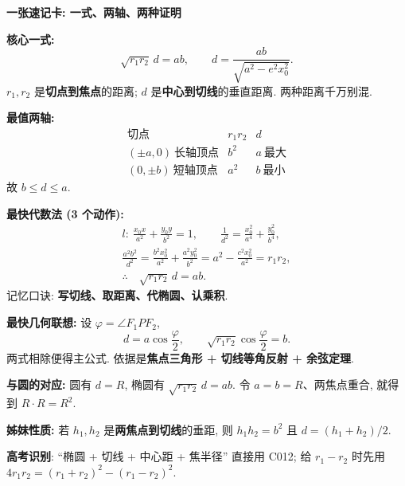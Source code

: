 \begin{summarybox}
\textbf{一张速记卡: 一式、两轴、两种证明}

\textbf{核心一式:}
\[
\boxed{\sqrt{r_1r_2}\,d=ab},\qquad
\boxed{d=\frac{ab}{\sqrt{a^2-e^2x_0^2}}}.
\]
$r_1,r_2$ 是\textbf{切点到焦点}的距离;
$d$ 是\textbf{中心到切线}的垂直距离. 两种距离千万别混.

\textbf{最值两轴:}
\[
\begin{array}{c|c|c}
\text{切点} & r_1r_2 & d\\ \hline
(\pm a,0)\ \text{长轴顶点} & b^2 & \boxed{a}\ \text{最大}\\
(0,\pm b)\ \text{短轴顶点} & a^2 & \boxed{b}\ \text{最小}
\end{array}
\]
故 $b\le d\le a$.

\textbf{最快代数法 (3 个动作):}
\[
\begin{gathered}
l:\ \frac{x_0x}{a^2}+\frac{y_0y}{b^2}=1,\qquad
\frac1{d^2}=\frac{x_0^2}{a^4}+\frac{y_0^2}{b^4},\\
\frac{a^2b^2}{d^2}
=\frac{b^2x_0^2}{a^2}+\frac{a^2y_0^2}{b^2}
=a^2-\frac{c^2x_0^2}{a^2}=r_1r_2,\\
\therefore\quad \sqrt{r_1r_2}\,d=ab.
\end{gathered}
\]
记忆口诀: \textbf{写切线、取距离、代椭圆、认乘积}.

\textbf{最快几何联想:} 设 $\varphi=\angle F_1PF_2$,
\[
\boxed{d=a\cos\frac\varphi2},\qquad
\boxed{\sqrt{r_1r_2}\cos\frac\varphi2=b}.
\]
两式相除便得主公式. 依据是\textbf{焦点三角形 + 切线等角反射 + 余弦定理}.

\textbf{与圆的对应:} 圆有 $d=R$, 椭圆有
$\sqrt{r_1r_2}\,d=ab$.
令 $a=b=R$、两焦点重合, 就得到 $R\cdot R=R^2$.

\textbf{姊妹性质:} 若 $h_1,h_2$ 是\textbf{两焦点到切线}的垂距,
则 $h_1h_2=b^2$ 且 $d=(h_1+h_2)/2$.

\textbf{高考识别}: ``椭圆 + 切线 + 中心距 + 焦半径'' 直接用 C012;
给 $r_1-r_2$ 时先用
$4r_1r_2=(r_1+r_2)^2-(r_1-r_2)^2$.
\end{summarybox}
